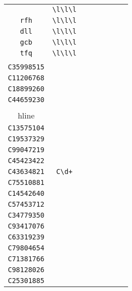 \begin{longtable}{cccccccc}
\begin{tabular}{ll}
    \verb|hzi| & \verb|\l\l\l|\\
\verb|rfh| & \verb|\l\l\l|\\
\verb|dll| & \verb|\l\l\l|\\
\verb|gcb| & \verb|\l\l\l|\\
\verb|tfq| & \verb|\l\l\l|
\end{tabular}
\\\midrule 
\begin{tabular}{l}
    \verb|C15605276|\\
\verb|C35998515|\\
\verb|C11206768|\\
\verb|C18899260|\\
\verb|C44659230|\\
\\hline\\
\verb|C13575104|\\
\verb|C19537329|\\
\verb|C99047219|\\
\verb|C45423422|\\
\verb|C43634821|
\end{tabular}

&
\verb|C\d+|
&

\begin{tabular}{l}
    \verb|C\d\d\d\d\d\d\d\d|\\
\verb|C75510881|\\
\verb|C14542640|\\
\verb|C57453712|\\
\verb|C34779350|\\
\verb|C93417076|
\end{tabular}

&

\begin{tabular}{l}
    \verb|C\d\d\d\d\d\d\d\d|\\
\verb|C63319239|\\
\verb|C79804654|\\
\verb|C71381766|\\
\verb|C98128026|\\
\verb|C25301885|
\end{tabular}

&


\end{longtable}
